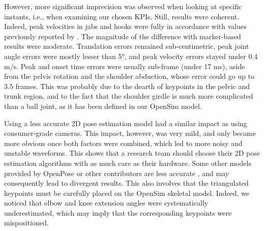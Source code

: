 However, more significant imprecision was observed when looking at specific instants, i.e., when examining our chosen KPIs. Still, results were coherent. Indeed, peak velocities in jabs and hooks were fully in accordance with values previously reported by \cite{Whiting1988,Piorkowski2011}. 
The magnitude of the difference with marker-based results were moderate. Translation errors remained sub-centimetric, peak joint angle errors were mostly lesser than 5°, and peak velocity errors stayed under 0.4 m/s. Peak and onset time errors were usually sub-frame (under 17 ms), aside from the pelvis rotation and the shoulder abduction, whose error could go up to 3.5 frames. This was probably due to the dearth of keypoints in the pelvic and trunk region, and to the fact that the shoulder girdle is much more complicated than a ball joint, as it has been defined in our OpenSim model.

Using a less accurate 2D pose estimation model had a similar impact as using consumer-grade cameras. This impact, however, was very mild, and only became more obvious once both factors were combined, which led to more noisy and unstable waveforms. This shows that a research team should choose their 2D pose estimation algorithms with as much care as their hardware. Some other models provided by OpenPose or other contributors are less accurate \cite{Needham2021b}, and may consequently lead to divergent results. This also involves that the triangulated keypoints must be carefully placed on the OpenSim skeletal model. Indeed, we noticed that elbow and knee extension angles were systematically underestimated, which may imply that the corresponding keypoints were mispositioned.

